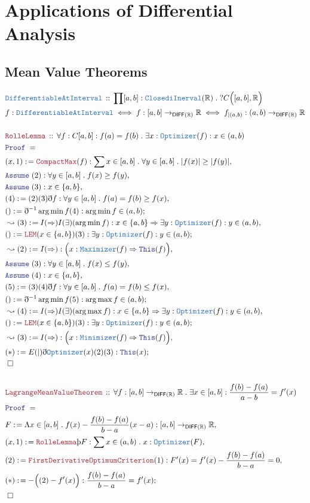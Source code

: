 \documentclass[12pt]{scrartcl}
\newcommand{\TYPE}[1]{\textcolor{NavyBlue}{\mathtt{#1}}}
\newcommand{\LOGIC}[1]{\textcolor{Blue}{\mathtt{#1}}}
\newcommand{\THM}[1]{\textcolor{Maroon}{\mathtt{#1}}}
\renewcommand{\.}{\; . \;}
\newcommand{\de}{: \kern 0.1pc =}
\newcommand{\Theorem}[2]{& \THM{#1} \, :: \, #2 \\ & \Proof = \\ }
\newcommand{\DeclareType}[2]{& \TYPE{#1} \, :: \, #2 \\}
\newcommand{\DefineNamedType}[4]{& #1 : \TYPE{#2} \iff #3 \iff #4 \\}
\newcommand{\Page}[1]{ \begin{align*} #1 \end{align*}   }
\newcommand{ \bd }{ \ByDef }
\newcommand{\Reals}{\mathbb{R} }
\newcommand{\Say}[3]{& #1 \de #2 : #3, \\}
\newcommand{\Conclude}[3]{& #1 \de #2 : #3; \\}
\newcommand{\Derive}[3]{& \leadsto #1 \de #2 : #3, \\}
\newcommand{\Assume}[2]{& \LOGIC{Assume} \;#1 : #2, \\}
\newcommand{\QED}{\; \square}
\newcommand{\EndProof}{& \QED \\}
\newcommand{\ByDef}{\eth}
\newcommand{\ByConstr}{\text{\thorn}}
\newcommand{\Proof}{\LOGIC{Proof} \; }
\newcommand{\DIFF}{\mathsf{DIFF}}
\begin{document}
\section{Applications of Differential Analysis}
\subsection{Mean Value Theorems}
\Page{
	\DeclareType{DifferentiableAtInterval}{\prod [a,b] : \TYPE{ClosediInerval}(\Reals) \. ?C\Big([a,b],\Reals\Big)}
	\DefineNamedType{f}{DifferentiableAtInterval}{f : [a,b] \to_{\DIFF(\Reals)} \Reals}{ 
		f_{|(a,b)}  : (a,b)\to_{\DIFF(\Reals)} \Reals   } 
	\\
	\Theorem{RolleLemma}{\forall f : C[a,b] : f(a) = f(b) \. \exists x  : \TYPE{Optimizer}(f) : x \in (a,b)}
	\Say{(x,1)}{\THM{CompactMax}(f)}{ \sum x \in [a,b] \. \forall y \in [a,b] \. |f(x)| \ge |f(y)|}
	\Assume{(2)}{\forall y \in [a,b] \. f(x) \ge f(y)}
	\Assume{(3)}{x \in \{a,b\}}
	\Say{(4)}{(2)(3)\bd f}{\forall y \in [a,b] \. f(a) = f(b) \ge f(x)}
	\Conclude{()}{\bd^{-1} \arg \min f (4)}{ \arg \min f \in (a,b)}
	\Derive{(3)}{I(\Rightarrow)I(\exists)(\arg \min f)}{x \in \{a,b\} \Rightarrow \exists y : \TYPE{Optimizer}(f)
		: y \in (a,b)
	}
	\Conclude{()}{\THM{LEM}(x \in \{a,b\})(3)}{\exists y : \TYPE{Optimizer}(f) : y \in (a,b)}
	\Derive{(2)}{I(\Rightarrow)}{\Big( x : \TYPE{Maximizer}(f) \Rightarrow \LOGIC{This}(f) \Big)}
	\Assume{(3)}{\forall y \in [a,b] \. f(x) \le f(y)}
	\Assume{(4)}{x \in \{a,b\}}
	\Say{(5)}{(3)(4)\bd f}{\forall y \in [a,b] \. f(a) = f(b) \le f(x)}
	\Conclude{()}{\bd^{-1} \arg \min f (5)}{ \arg \max f \in (a,b)}
	\Derive{(4)}{I(\Rightarrow)I(\exists)(\arg \max f)}{x \in \{a,b\} \Rightarrow \exists y : \TYPE{Optimizer}(f)
		: y \in (a,b)
	}
	\Conclude{()}{\THM{LEM}(x \in \{a,b\})(3)}{\exists y : \TYPE{Optimizer}(f) : y \in (a,b)}
	\Derive{(3)}{I(\Rightarrow)}{\Big( x : \TYPE{Minimizer}(f) \Rightarrow \LOGIC{This}(f) \Big)}
	\Conclude{(*)}{E(|)\bd \TYPE{Optimizer}(x)(2)(3)}{\LOGIC{This}(x)}
	\EndProof
	\\
	\Theorem{LagrangeMeanValueTheorem}{  \forall f : [a,b]  \to_{\DIFF(\Reals)}  \Reals \. 
		\exists x \in [a,b] : \frac{f(b) - f(a)}{a - b} = f'(x)    }
	\Say{F}{\Lambda x \in [a,b] \. f(x) - \frac{f(b) - f(a)}{b - a} (x - a)}
	{   [a,b] \to_{\DIFF(\Reals)} \Reals}
	\Say{ (x,1) }{\THM{RolleLemma}\ByConstr F }
	{\sum x \in (a,b) \. x : \TYPE{Optimizer}(F)}
	\Say{ (2)}{\THM{FirstDerivativeOptimumCriterion}(1) }{F'(x) =  f'(x) - \frac{f(b) - f(a)}{b - a} =  0}
	\Conclude{(*)}{ -\Big( (2) - f'(x) \Big)}{ \frac{f(b) - f(a)}{b - a} = f'(x)}
	\EndProof
}
\end{document}
